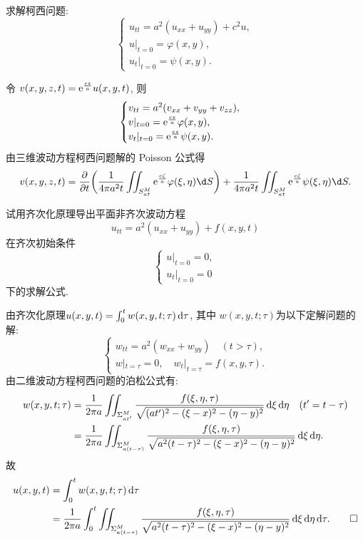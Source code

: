 \begin{exercise}
  求解柯西问题:
  \[\begin{cases}
    u_{tt} = a^2(u_{xx}+u_{yy}) + c^2u, \\
    u|_{t=0} = \varphi(x,y), \\
    u_t|_{t=0} = \psi(x,y).
  \end{cases}\]
\end{exercise}

\begin{solve}
  令 $v(x,y,z,t) = \mathrm{e}^{\frac{cz}{a}} u(x,y,t)$, 则
  \[\begin{cases}
    v_{tt} = a^2(v_{xx} + v_{yy} + v_{zz}), \\
    v|_{t=0} = \mathrm{e}^{\frac{cz}{a}}\varphi(x,y), \\
    v_t|_{t=0} = \mathrm{e}^{\frac{cz}{a}}\psi(x,y).
  \end{cases}\]
  由三维波动方程柯西问题解的 Poisson 公式得
  \[v(x,y,z,t) = \frac{\partial}{\partial t}
    \biggl(\frac{1}{4\pi a^2t}\iint_{S_{at}^M} \e^{\frac{c\zeta}{a}}\varphi(\xi,\eta)\d S\biggr)
    + \frac{1}{4\pi a^2t}\iint_{S_{at}^M} \e^{\frac{c\zeta}{a}}\psi(\xi,\eta)\d S.\]
\end{solve}


\begin{exercise}[6]
  试用齐次化原理导出平面非齐次波动方程
  \[u_{tt} = a^2(u_{xx}+u_{yy})+f(x,y,t)\]
  在齐次初始条件
  \[\begin{cases}
    u|_{t=0} = 0, \\
    u_t|_{t=0} = 0
  \end{cases}\]
  下的求解公式.
\end{exercise}

\begin{solve}
  由齐次化原理$u(x,y,t)=\int_0^tw(x,y,t;\tau)\mathop{}\!\mathrm{d}\tau$, 其中 $w(x,y,t;\tau)$为以下定解问题的解:
  \[\begin{cases}
    w_{tt} = a^2(w_{xx}+w_{yy})\quad (t>\tau), \\
    w|_{t=\tau} = 0,\quad w_t|_{t=\tau} = f(x,y,\tau).
  \end{cases}\]
  由二维波动方程柯西问题的泊松公式有:
  \[\begin{split}
    w(x,y,t;\tau)
    & = \frac{1}{2\pi a}\iint_{\Sigma_{at'}^M}
      \frac{f(\xi,\eta,\tau)}{\sqrt{(at')^2
      -(\xi-x)^2-(\eta-y)^2}}\mathop{}\!\mathrm{d}\xi\mathop{}\!\mathrm{d}\eta\quad(t'=t-\tau)\\
    & = \frac{1}{2\pi a}\iint_{\Sigma_{a(t-\tau)}^M}
      \frac{f(\xi,\eta,\tau)}{\sqrt{a^2(t-\tau)^2-(\xi-x)^2-(\eta-y)^2}}
      \mathop{}\!\mathrm{d}\xi\mathop{}\!\mathrm{d}\eta.
  \end{split}\]
  故
  \begin{align*}
    u(x,y,t)
    & = \int_0^tw(x,y,t;\tau)\mathop{}\!\mathrm{d}\tau \\
    & = \frac{1}{2\pi a}\int_0^t\iint_{\Sigma_{a(t-\tau)}^M}
      \frac{f(\xi,\eta,\tau)}{\sqrt{a^2(t-\tau)^2-(\xi-x)^2-(\eta-y)^2}}
      \mathop{}\!\mathrm{d}\xi\mathop{}\!\mathrm{d}\eta\mathop{}\!\mathrm{d}\tau.\qedhere
  \end{align*}
\end{solve}


